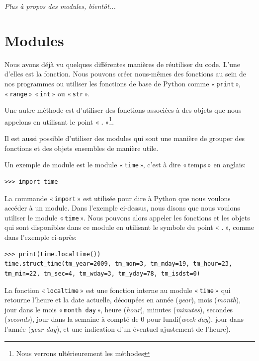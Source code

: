 \emph{Plus à propos des modules, bientôt...}

\section{Modules\label{section:modules}}
Nous avons déjà vu quelques différentes manières de réutiliser du code. L'une d'elles est la fonction. Nous pouvons créer nous-mêmes des fonctions au sein de nos programmes ou utiliser les fonctions de base de Python comme « \texttt{print} », « \texttt{range} » « \texttt{int} » ou « \texttt{str} ». 

Une autre méthode est d'utiliser des fonctions associées à des objets que nous appelons en utilisant le point « \texttt{.} »\footnote{Nous verrons ultérieurement les méthodes}.
 
Il est aussi possible d'utiliser des modules qui sont une manière de grouper des fonctions et des objets ensembles de manière utile.

Un exemple de module est le module « \texttt{time} », c'est à dire « temps »   en anglais:

\begin{Verbatim}[frame=single,rulecolor=\color{mbleu}, label=à taper]
>>> import time
\end{Verbatim}

La commande « \texttt{import} » est utilisée pour dire à Python que nous voulons accéder à un module.
Dans l'exemple ci-dessus, nous disons que nous voulons utiliser le module « \texttt{time} ».
Nous pouvons alors appeler les fonctions et les objets qui sont disponibles dans ce module en utilisant le symbole du point « \texttt{.} », comme dans l'exemple ci-après:

\begin{Verbatim}[frame=single,rulecolor=\color{mbleu}, label=à taper]
>>> print(time.localtime())
time.struct_time(tm_year=2009, tm_mon=3, tm_mday=19, tm_hour=23, 
tm_min=22, tm_sec=4, tm_wday=3, tm_yday=78, tm_isdst=0)
\end{Verbatim}

La fonction « \texttt{localtime} » est une fonction interne au module « \texttt{time} » qui retourne l'heure et la date actuelle, découpées en année (\emph{year}), mois (\emph{month}), jour dans le mois « \texttt{month day} », heure (\emph{hour}), minutes (\emph{minutes}), secondes (\emph{seconds}), jour dans la semaine à compté de 0 pour lundi(\emph{week day}), jour dans l'année (\emph{year day}), et une indication d'un éventuel ajustement de l'heure).

